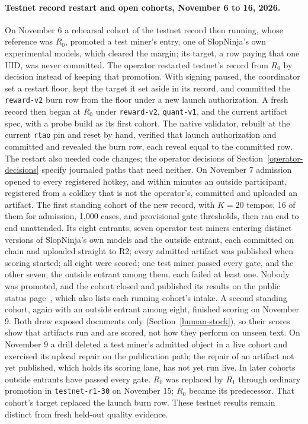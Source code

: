 \paragraph{Testnet record restart and open cohorts, November 6 to 16, 2026.}\label{testnet-r1}
On November 6 a rehearsal cohort of the testnet record then running, whose
reference was \(R_0\), promoted a test miner's entry, one of SlopNinja's own
experimental models, which cleared the margin;
its target, a row paying that one UID, was never committed. The operator
restarted testnet's record from \(R_0\) by decision instead of keeping that
promotion.
With signing paused, the coordinator set a restart floor, kept the target it
set aside in its record, and committed the \texttt{reward-v2} burn row from the
floor under a new launch authorization. A fresh record then began at \(R_0\)
under \texttt{reward-v2}, \texttt{quant-v1}, and the current artifact spec,
with a probe build as its first cohort. The native validator, rebuilt at the
current \texttt{rtao} pin and reset by hand, verified that launch authorization
and committed and revealed the burn row, each reveal equal to the committed row.
The restart also needed code changes; the operator decisions of
Section~\ref{operator-decisions} specify journaled paths that need neither.
On November 7 admission opened to every registered hotkey, and within minutes
an outside participant, registered from a coldkey that is not the operator's,
committed and uploaded an artifact. The first standing cohort of the new
record, with \(K=20\) tempos, 16 of them for admission, 1,000 cases, and
provisional gate thresholds, then ran end to end unattended. Its eight
entrants, seven operator test miners entering distinct versions of SlopNinja's
own models and the outside entrant, each committed on chain and uploaded
straight to R2; every admitted artifact was published when scoring started; all
eight were scored; one test miner passed every gate, and the other seven, the
outside entrant among them, each failed at least one. Nobody was promoted, and
the cohort closed and published its results on the public status
page~\cite{testnetstatus}, which also lists each running cohort's intake. A
second standing cohort, again with an outside entrant among eight, finished
scoring on November 9. Both drew exposed documents only
(Section~\ref{human-stock}), so their scores show that artifacts run and are
scored, not how they perform on unseen text. On November 9 a drill deleted a
test miner's admitted object in a live cohort and exercised its upload repair
on the publication path; the repair of an artifact not yet published, which
holds its scoring lane, has not yet run live. In later cohorts outside entrants
have passed every gate. \(R_0\) was replaced by \(R_1\) through ordinary
promotion in \texttt{testnet-r1-30} on November 15; \(R_0\) became its
predecessor. That cohort's target replaced the launch burn row. These
testnet results remain distinct from fresh held-out quality evidence.

